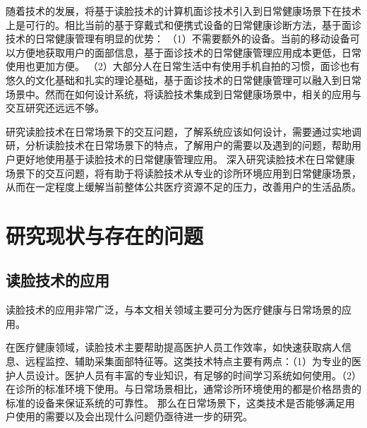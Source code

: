 

随着技术的发展，将基于读脸技术的计算机面诊技术引入到日常健康场景下在技术上是可行的。相比当前的基于穿戴式和便携式设备的日常健康诊断方法，基于面诊技术的日常健康管理有明显的优势：
（1）不需要额外的设备。当前的移动设备可以方便地获取用户的面部信息，基于面诊技术的日常健康管理应用成本更低，日常使用也更加方便。
（2）大部分人在日常生活中有使用手机自拍的习惯，面诊也有悠久的文化基础和扎实的理论基础，基于面诊技术的日常健康管理可以融入到日常场景中。然而在如何设计系统，将读脸技术集成到日常健康场景中，相关的应用与交互研究还远远不够。

研究读脸技术在日常场景下的交互问题，了解系统应该如何设计，需要通过实地调研，分析读脸技术在日常场景下的特点，了解用户的需要以及遇到的问题，帮助用户更好地使用基于读脸技术的日常健康管理应用。
深入研究读脸技术在日常健康场景下的交互问题，将有助于将读脸技术从专业的诊所环境应用到日常健康场景，从而在一定程度上缓解当前整体公共医疗资源不足的压力，改善用户的生活品质。



\section{研究现状与存在的问题}


\subsection{读脸技术的应用}
读脸技术的应用非常广泛，与本文相关领域主要可分为医疗健康与日常场景的应用。

在医疗健康领域，读脸技术主要帮助提高医护人员工作效率，如快速获取病人信息\cite{nwosu2016mobile}、远程监控\cite{Hossain2015Cloud}、辅助采集面部特征\cite{张红凯2015中医面诊信息采集与识别方法研究进展}等。这类技术特点主要有两点：（1）为专业的医护人员设计。医护人员有丰富的专业知识，有足够的时间学习系统如何使用。（2）在诊所的标准环境下使用。与日常场景相比，通常诊所环境使用的都是价格昂贵的标准的设备来保证系统的可靠性。
那么在日常场景下，这类技术是否能够满足用户使用的需要以及会出现什么问题仍亟待进一步的研究。

